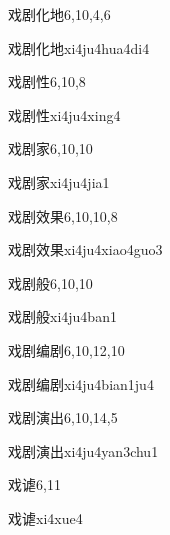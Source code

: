 \begin{entry}{戏剧化地}{6,10,4,6}
  \begin{phonetics}{戏剧化地}{xi4ju4hua4di4}
  \end{phonetics}
\end{entry}

\begin{entry}{戏剧性}{6,10,8}
  \begin{phonetics}{戏剧性}{xi4ju4xing4}
  \end{phonetics}
\end{entry}

\begin{entry}{戏剧家}{6,10,10}
  \begin{phonetics}{戏剧家}{xi4ju4jia1}
  \end{phonetics}
\end{entry}

\begin{entry}{戏剧效果}{6,10,10,8}
  \begin{phonetics}{戏剧效果}{xi4ju4xiao4guo3}
  \end{phonetics}
\end{entry}

\begin{entry}{戏剧般}{6,10,10}
  \begin{phonetics}{戏剧般}{xi4ju4ban1}
  \end{phonetics}
\end{entry}

\begin{entry}{戏剧编剧}{6,10,12,10}
  \begin{phonetics}{戏剧编剧}{xi4ju4bian1ju4}
  \end{phonetics}
\end{entry}

\begin{entry}{戏剧演出}{6,10,14,5}
  \begin{phonetics}{戏剧演出}{xi4ju4yan3chu1}
  \end{phonetics}
\end{entry}

\begin{entry}{戏谑}{6,11}
  \begin{phonetics}{戏谑}{xi4xue4}
  \end{phonetics}
\end{entry}

